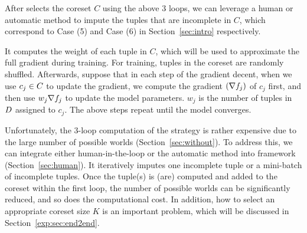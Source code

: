  After \ours selects the coreset $C$ using the above 3 loops, we can leverage a human or automatic method to impute the tuples that are incomplete in $C$, which correspond to Case (5) and Case (6) in Section~\ref{sec:intro} respectively. 




 It computes the weight of each tuple in $C$, which will be used to approximate the full gradient during training. For training, tuples in the coreset are randomly shuffled. Afterwards, suppose that in each step of the gradient decent, when we use $c_j \in C$ to update the gradient, we compute the gradient $(\nabla f_j)$ of $c_j$ first, and then use $w_j\nabla f_j$ to update the model parameters. $w_j$ is the number of tuples in $D$ assigned to $c_j$.  The above steps repeat until the model converges.


 Unfortunately, the 3-loop computation of the strategy is rather expensive due to the large number of possible worlds (Section~\ref{sec:without}).   To address this, we can   integrate either human-in-the-loop or the automatic method into \ours framework (Section~\ref{sec:human}).  It iteratively imputes one incomplete tuple or a mini-batch of incomplete tuples. Once the tuple(s) is (are) computed and added to the coreset within the first loop, the number of possible worlds can be significantly reduced, and so does the computational cost. In addition, how to select an appropriate coreset size $K$ is an important problem, which will be discussed in Section~\ref{exp:sec:end2end}.


